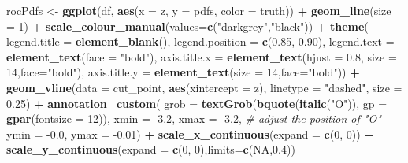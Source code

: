 \documentclass[
]{book}
\newenvironment{Shaded}{\begin{snugshade}}{\end{snugshade}}
\newcommand{\CommentTok}[1]{\textcolor[rgb]{0.56,0.35,0.01}{\textit{#1}}}
\newcommand{\DataTypeTok}[1]{\textcolor[rgb]{0.13,0.29,0.53}{#1}}
\newcommand{\DecValTok}[1]{\textcolor[rgb]{0.00,0.00,0.81}{#1}}
\newcommand{\FloatTok}[1]{\textcolor[rgb]{0.00,0.00,0.81}{#1}}
\newcommand{\KeywordTok}[1]{\textcolor[rgb]{0.13,0.29,0.53}{\textbf{#1}}}
\newcommand{\NormalTok}[1]{#1}
\newcommand{\OperatorTok}[1]{\textcolor[rgb]{0.81,0.36,0.00}{\textbf{#1}}}
\newcommand{\OtherTok}[1]{\textcolor[rgb]{0.56,0.35,0.01}{#1}}
\newcommand{\StringTok}[1]{\textcolor[rgb]{0.31,0.60,0.02}{#1}}
\begin{document}
\begin{Shaded}
\begin{Highlighting}[]
\NormalTok{rocPdfs \textless{}{-}}\StringTok{ }\KeywordTok{ggplot}\NormalTok{(df, }\KeywordTok{aes}\NormalTok{(}\DataTypeTok{x =}\NormalTok{ z, }\DataTypeTok{y =}\NormalTok{ pdfs, }\DataTypeTok{color =}\NormalTok{ truth)) }\OperatorTok{+}\StringTok{ }
\StringTok{  }\KeywordTok{geom\_line}\NormalTok{(}\DataTypeTok{size =} \DecValTok{1}\NormalTok{) }\OperatorTok{+}\StringTok{ }
\StringTok{  }\KeywordTok{scale\_colour\_manual}\NormalTok{(}\DataTypeTok{values=}\KeywordTok{c}\NormalTok{(}\StringTok{"darkgrey"}\NormalTok{,}\StringTok{"black"}\NormalTok{)) }\OperatorTok{+}\StringTok{ }
\StringTok{  }\KeywordTok{theme}\NormalTok{(}
    \DataTypeTok{legend.title =} \KeywordTok{element\_blank}\NormalTok{(), }
    \DataTypeTok{legend.position =} \KeywordTok{c}\NormalTok{(}\FloatTok{0.85}\NormalTok{, }\FloatTok{0.90}\NormalTok{), }
    \DataTypeTok{legend.text =} \KeywordTok{element\_text}\NormalTok{(}\DataTypeTok{face =} \StringTok{"bold"}\NormalTok{), }
    \DataTypeTok{axis.title.x =} \KeywordTok{element\_text}\NormalTok{(}\DataTypeTok{hjust =} \FloatTok{0.8}\NormalTok{, }\DataTypeTok{size =} \DecValTok{14}\NormalTok{,}\DataTypeTok{face=}\StringTok{"bold"}\NormalTok{),}
    \DataTypeTok{axis.title.y =} \KeywordTok{element\_text}\NormalTok{(}\DataTypeTok{size =} \DecValTok{14}\NormalTok{,}\DataTypeTok{face=}\StringTok{"bold"}\NormalTok{)) }\OperatorTok{+}
\StringTok{  }\KeywordTok{geom\_vline}\NormalTok{(}\DataTypeTok{data =}\NormalTok{ cut\_point, }\KeywordTok{aes}\NormalTok{(}\DataTypeTok{xintercept =}\NormalTok{ z), }
             \DataTypeTok{linetype =} \StringTok{"dashed"}\NormalTok{, }\DataTypeTok{size =} \FloatTok{0.25}\NormalTok{) }\OperatorTok{+}
\StringTok{  }\KeywordTok{annotation\_custom}\NormalTok{(}
    \DataTypeTok{grob =} 
      \KeywordTok{textGrob}\NormalTok{(}\KeywordTok{bquote}\NormalTok{(}\KeywordTok{italic}\NormalTok{(}\StringTok{"O"}\NormalTok{)),}
               \DataTypeTok{gp =} \KeywordTok{gpar}\NormalTok{(}\DataTypeTok{fontsize =} \DecValTok{12}\NormalTok{)), }
    \DataTypeTok{xmin =} \FloatTok{{-}3.2}\NormalTok{, }\DataTypeTok{xmax =} \FloatTok{{-}3.2}\NormalTok{, }\CommentTok{\# adjust the position of "O"}
    \DataTypeTok{ymin =} \FloatTok{{-}0.0}\NormalTok{, }\DataTypeTok{ymax =} \FloatTok{{-}0.01}\NormalTok{) }\OperatorTok{+}
\StringTok{  }\KeywordTok{scale\_x\_continuous}\NormalTok{(}\DataTypeTok{expand =} \KeywordTok{c}\NormalTok{(}\DecValTok{0}\NormalTok{, }\DecValTok{0}\NormalTok{)) }\OperatorTok{+}\StringTok{ }
\StringTok{  }\KeywordTok{scale\_y\_continuous}\NormalTok{(}\DataTypeTok{expand =} \KeywordTok{c}\NormalTok{(}\DecValTok{0}\NormalTok{, }\DecValTok{0}\NormalTok{),}\DataTypeTok{limits=}\KeywordTok{c}\NormalTok{(}\OtherTok{NA}\NormalTok{,}\FloatTok{0.4}\NormalTok{))}


\end{Highlighting}
\end{Shaded}
\end{document}
